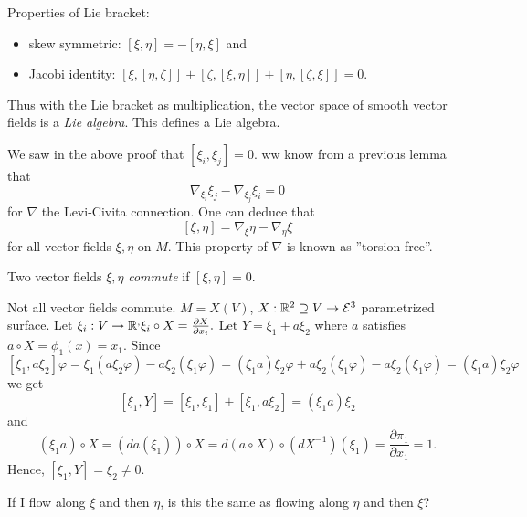 \begin{remark}
	Properties of Lie bracket:
	\begin{itemize}
		\item skew symmetric: $ [\xi,\eta] = - [\eta,\xi] $ and
		\item Jacobi identity: $ [\xi, [\eta,\zeta]] + [\zeta,[\xi,\eta]] + [\eta,[\zeta,\xi]] = 0 $.
	\end{itemize}
\end{remark}

\begin{definition}
	Thus with the Lie bracket as multiplication, the vector space of smooth vector fields is a \emph{Lie algebra}. This defines a Lie algebra.
\end{definition}

\begin{remark}
	We saw in the above proof that $[\xi_i,\xi_j]=0$. ww know from a previous lemma that
	\[ \nabla_{\xi_i} \xi_j - \nabla_{\xi_j}\xi_i = 0 \]
	for $\nabla$ the Levi-Civita connection. One can deduce that
	\[ [\xi,\eta] = \nabla_\xi \eta - \nabla_\eta \xi  \] 
	for all vector fields $\xi,\eta$ on $M$. This property of $\nabla$ is known as ''torsion free''.
\end{remark}

\begin{definition}
	
	Two vector fields $ \xi, \eta $ \emph{commute} if $ [\xi,\eta] = 0 $.
	
\end{definition}

\begin{example}
	Not all vector fields commute. $ M = X(V) $, $ X: \mathbb R^2 \supseteq V \rightarrow \mathcal E^3 $ parametrized surface. Let $ \xi_i:V \rightarrow \mathbb R^, \xi_i\circ X = \frac{\partial X}{\partial x_i}. $ Let $ Y = \xi_1 + a\xi_2 $ where $ a $ satisfies $ a\circ X = \phi_1(x) = x_1 $. Since 
		\[ [\xi_1, a\xi_2]\varphi
		= \xi_1(a\xi_2 \varphi)- a\xi_2(\xi_1\varphi)
		= (\xi_1 a)\xi_2\varphi + a\xi_2(\xi_1\varphi) - a\xi_2(\xi_1\varphi)
		= (\xi_1 a)\xi_2\varphi \]
	we get 
		\[ [\xi_1,Y] = [\xi_1,\xi_1] + [\xi_1,a\xi_2] = (\xi_1a)\xi_2 \]
	and 
		\[ (\xi_1 a) \circ X = (da(\xi_1))\circ X = d(a \circ X) \circ (dX^{-1})(\xi_1) = \frac {\partial \pi_1}{\partial x_1} = 1.   \]
	Hence, $ [\xi_1,Y] = \xi_2 \neq 0 $.
\end{example}

If I flow along $ \xi $ and then $ \eta $, is this the same as flowing along $ \eta $ and then $ \xi $?

